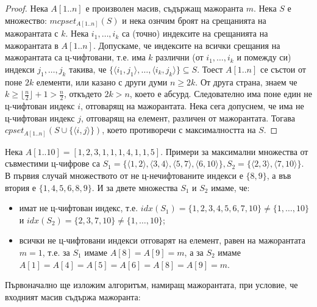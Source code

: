 \begin{solution}
	\begin{proof}
		Нека $A[1..n]$ е произволен масив, съдържащ мажоранта $m$. Нека $S$ е множество: $mcpset_{A[1..n]}(S)$ и нека ознчим броят на срещанията на мажорантата с $k$. Нека $i_1,\dots,i_k$ са (точно) индексите на срещанията на мажорантата в $A[1..n]$. Допускаме, че индексите на всички срещания на мажорантата са ц-чифтовани, т.е. има $k$ различни (от $i_1,\dots,i_k$ и помежду си) индекси $j_1,\dots,j_k$ такива, че $\{\langle i_1,j_1\rangle,\dots,\langle i_k,j_k\rangle\}\subseteq S$. Тоест $A[1..n]$ се състои от поне $2k$ елементи, или казано с други думи $n\ge2k$. От друга страна, знаем че $k\ge\lfloor\frac n2\rfloor+1>\frac n2$, откъдето $2k>n$, което е абсурд. Следователно има поне един не ц-чифтован индекс $i$, отговарящ на мажорантата. Нека сега допуснем, че има не ц-чифтован индекс $j$, отговарящ на елемент, различен от мажорантата. Тогава $cpset_{A[1..n]}(S\cup\{\langle i,j\rangle\})$, което противоречи с максималността на $S$. 
	\end{proof}

	\vspace{0.3cm}

	\begin{examplecp}
		Нека $A[1..10]=[1,2,3,1,1,1,4,1,1,5]$. Примери за максимални множества от съвместими ц-чифрове са $S_1=\{\langle1,2\rangle,\langle3,4\rangle,\langle5,7\rangle,\langle6,10\rangle\},S_2=\{\langle2,3\rangle,\langle7,10\rangle\}$. В първия случай множеството от не ц-нечифтованите индекси е $\{8,9\}$, а във втория е $\{1,4,5,6,8,9\}$. И за двете множества $S_1$ и $S_2$ имаме, че:
		\begin{itemize}
			\item имат не ц-чифтован индекс, т.е. $idx(S_1)=\{1,2,3,4,5,6,7,10\}\ne\{1,\dots,10\}$ и $idx(S_2)=\{2,3,7,10\}\ne\{1,\dots,10\}$;
			\item всички не ц-чифтовани индекси отговарят на елемент, равен на мажорантата $m=1$, т.е. за $S_1$ имаме $A[8]=A[9]=m$, а за $S_2$ имаме $A[1]=A[4]=A[5]=A[6]=A[8]=A[9]=m$.
		\end{itemize}
	\end{examplecp}\noindent\newline

	\noindent
	Първоначално ще изложим алгоритъм, намиращ мажорантата, при условие, че входният масив съдържа мажоранта:
	\begin{pseudocode}
		

\end{pseudocode}
\end{solution}
